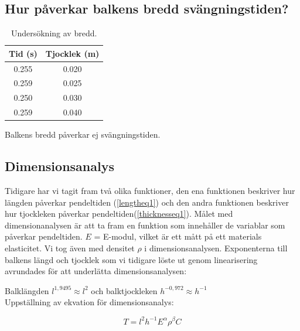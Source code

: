 \documentclass[10pt, titlepage, oneside, a4paper]{article}
\begin{document}
        \subsection{Hur påverkar balkens bredd svängningstiden?}
        \begin{table}[H]
            \caption{Undersökning av bredd.}
            \begin{center}
                \begin{tabular}{cc}
                    \hline
                    Tid (s) & Tjocklek (m)\\
                    \hline
                    0.255 & 0.020\\
                    0.259 & 0.025\\
                    0.250 & 0.030\\
                    0.259 & 0.040\\
                \end{tabular}
            \end{center}
            Balkens bredd påverkar ej svängningstiden.
        \end{table}
        \subsection{Dimensionsanalys}

Tidigare har vi tagit fram två olika funktioner, den ena funktionen beskriver hur längden påverkar pendeltiden (\ref{lengtheq1}) och den andra funktionen beskriver hur tjockleken påverkar pendeltiden(\ref{thicknesseq1}). Målet med dimensionanalysen är att ta fram en funktion som innehåller de variablar som påverkar pendeltiden. $E$ = E-modul, vilket är ett mått på ett materials elasticitet. Vi tog även med densitet $\rho$ i dimensionsanalysen. Exponenterna till balkens längd och tjocklek som vi tidigare löste ut genom linearisering avrundades för att underlätta dimensionsanalysen:

\begin{center}
Balklängden $l^{1,9495} \approx l^2$ och balktjockleken $h^{-0,972} \approx h^{-1}$\\
\vspace{18pt}
Uppställning av ekvation för dimensionsanalys:
\end{center}


\begin{equation}\label{dimeq1}
T= l^2 h^{-1} E^\alpha \rho ^\beta C
\end{equation}
\end{document}
